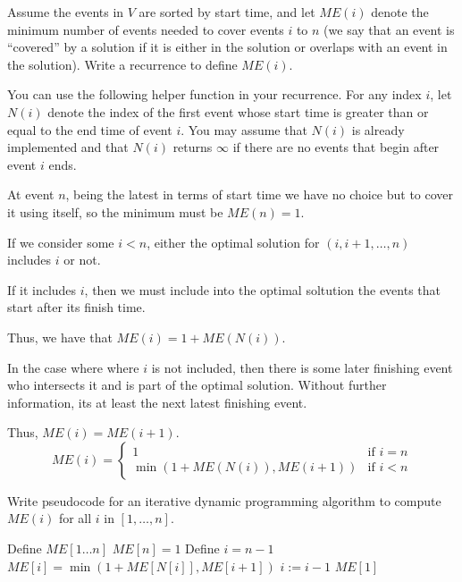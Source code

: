 \begin{questions}
	\question[4] Assume the events in $V$ are sorted by start time, and let $ME(i)$ denote the minimum number of events needed to cover events $i$ to $n$ (we say that an event is ``covered'' by a solution if it is either in the solution or overlaps with an event in the solution). Write a recurrence to define $ME(i)$.

	You can use the following helper function in your recurrence. For any index $i$, let $N(i)$ denote the index of the first event whose start time is greater than or equal to the end time of event $i$. You may assume that $N(i)$ is already implemented and that $N(i)$ returns $\infty$ if there are no events that begin after event $i$ ends.

	\ifsolutions\fi


	\begin{soln}
		At event \(n\), being the latest in terms of start time we have no choice but to cover it using itself, so the minimum must be \(ME(n) = 1\).

		If we consider some \(i < n\), either the optimal solution for \((i, i + 1, \dots, n)\) includes \(i\) or not.

		If it includes \(i\), then we must include into the optimal soltution the events that start after its finish time.

		Thus, we have that \(ME(i) = 1 + ME(N(i))\).

		In the case where where \(i\) is not included, then there is some later finishing event who intersects it and is part of the optimal solution.
		Without further information, its at least the next latest finishing event.

		Thus, \(ME(i) = ME(i+1)\).
		\[
			ME(i) = \begin{cases}
				1                              & \text{if } i = n \\
				\min(1 + ME(N(i)),  ME(i + 1)) & \text{if } i < n
			\end{cases}
		\]


	\end{soln}

	\question[4] Write pseudocode for an iterative dynamic programming algorithm to compute $ME(i)$ for all $i$ in $[1, \ldots, n]$.
	\ifsolutions\fi
	\begin{soln}
		\begin{algorithmic}[1]
			\State Define $ME[1 \dots n]$
			\State $ME[n] = 1$
			\State Define $i = n - 1$
			\State $ME[i] = \min(1 + ME[N[i]], ME[i+1])$
			\State $i := i - 1$
			\EndWhile
			\State \Return $ME[1]$
			\EndProcedure
		\end{algorithmic}
	\end{soln}


\end{questions}
